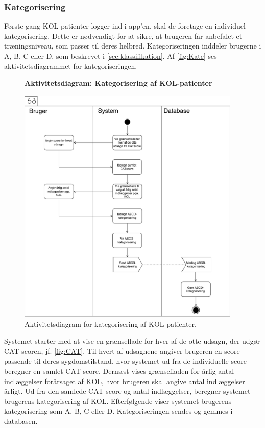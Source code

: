 \subsubsection*{Kategorisering} \label{sec:kategorisering}
Første gang KOL-patienter logger ind i app'en, skal de foretage en individuel kategorisering. Dette er nødvendigt for at sikre, at brugeren får anbefalet et træningsniveau, som passer til deres helbred.
Kategoriseringen inddeler brugerne i A, B, C eller D, som beskrevet i \autoref{sec:klassifikation}. Af \autoref{fig:Kate} ses aktivitetsdiagrammet for kategoriseringen.

\begin{figure} [H]
\centering
\textbf{Aktivitetsdiagram: Kategorisering af KOL-patienter}\par\medskip
\includegraphics[width=0.95\textwidth]{figures/aktivitetsdiagram/Kategorisering}
\caption{Aktivitetsdiagram for kategorisering af KOL-patienter.}
\label{fig:Kate}
\end{figure}

\noindent
Systemet starter med at vise en grænseflade for hver af de otte udsagn, der udgør CAT-scoren, jf. \autoref{fig:CAT}. Til hvert af udsagnene angiver brugeren en score passende til deres sygdomstilstand, hvor systemet ud fra de individuelle score beregner en samlet CAT-score. 
Dernæst vises grænsefladen for årlig antal indlæggelser forårsaget af KOL, hvor brugeren skal angive antal indlæggelser årligt. Ud fra den samlede CAT-score og antal indlæggelser, beregner systemet brugerens kategorisering af KOL. Efterfølgende viser systemet brugerens kategorisering som  A, B, C eller D.
Kategoriseringen sendes og gemmes i databasen.  